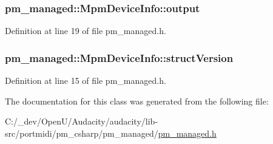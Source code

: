 \subsubsection[{\texorpdfstring{output}{output}}]{ pm\+\_\+managed\+::\+Mpm\+Device\+Info\+::output}\hypertarget{classpm__managed_1_1_mpm_device_info_acc3fb0bf6e92088536d694ba2556f4d4}{}\label{classpm__managed_1_1_mpm_device_info_acc3fb0bf6e92088536d694ba2556f4d4}


Definition at line 19 of file pm\+\_\+managed.\+h.

\subsubsection[{\texorpdfstring{struct\+Version}{structVersion}}]{ pm\+\_\+managed\+::\+Mpm\+Device\+Info\+::struct\+Version}\hypertarget{classpm__managed_1_1_mpm_device_info_aef7846288782a1cf3419820db7c780f6}{}\label{classpm__managed_1_1_mpm_device_info_aef7846288782a1cf3419820db7c780f6}


Definition at line 15 of file pm\+\_\+managed.\+h.



The documentation for this class was generated from the following file\+:\begin{DoxyCompactItemize}
\item 
C\+:/\+\_\+dev/\+Open\+U/\+Audacity/audacity/lib-\/src/portmidi/pm\+\_\+csharp/pm\+\_\+managed/\hyperlink{pm__managed_8h}{pm\+\_\+managed.\+h}\end{DoxyCompactItemize}
